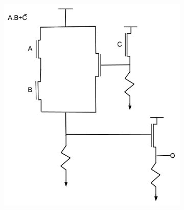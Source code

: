 {\begin{solution}
\begin{figure}[h!]
\begin{subfigure}[H]{0.4\textwidth}
				\includegraphics[width=\textwidth]{images/solution432.png}
			\end{subfigure}
			\quad
			\begin{subfigure}[H]{0.4\textwidth}

\end{subfigure}
\end{figure}
\end{solution}}
